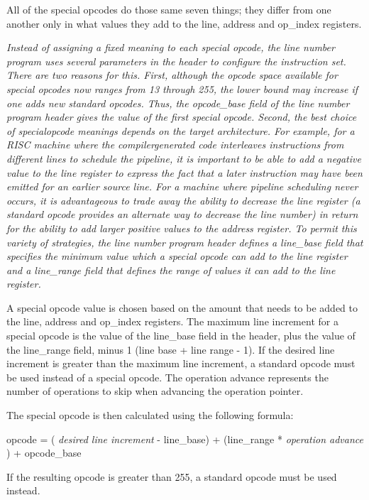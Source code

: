 All of the special opcodes do those same seven things; they
differ from one another only in what values they add to the
line, address and op\_index registers.


\textit{Instead of assigning a fixed meaning to each special opcode,
the line number program uses several parameters in the header
to configure the instruction set. There are two reasons
for this.  First, although the opcode space available for
special opcodes now ranges from 13 through 255, the lower
bound may increase if one adds new standard opcodes. Thus, the
opcode\_base field of the line number program header gives the
value of the first special opcode. Second, the best choice of
special\dash opcode meanings depends on the target architecture. For
example, for a RISC machine where the compiler\dash generated code
interleaves instructions from different lines to schedule
the pipeline, it is important to be able to add a negative
value to the line register to express the fact that a later
instruction may have been emitted for an earlier source
line. For a machine where pipeline scheduling never occurs,
it is advantageous to trade away the ability to decrease
the line register (a standard opcode provides an alternate
way to decrease the line number) in return for the ability
to add larger positive values to the address register. To
permit this variety of strategies, the line number program
header defines a line\_base field that specifies the minimum
value which a special opcode can add to the line register
and a line\_range field that defines the range of values it
can add to the line register.}


A special opcode value is chosen based on the amount that needs
to be added to the line, address and op\_index registers. The
maximum line increment for a special opcode is the value
of the line\_base field in the header, plus the value of
the line\_range field, minus 1 (line base + 
line range - 1). 
If the desired line increment is greater than the maximum
line increment, a standard opcode must be used instead of a
special opcode. The operation advance represents the number
of operations to skip when advancing the operation pointer.

The special opcode is then calculated using the following formula:

  opcode = ( \textit{desired line increment} - line\_base) +
(line\_range * \textit{operation advance} ) + opcode\_base

If the resulting opcode is greater than 255, a standard opcode
must be used instead.

